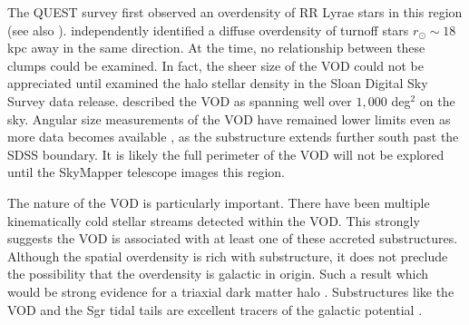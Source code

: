 \documentclass{emulateapj}
\begin{document}
The QUEST survey \citet{Vivas;et-al_2001} first observed an overdensity of RR Lyrae stars in this region (see also \citet{Zinn;etal_2004}). \citet{Newberg;et-al_2002} independently identified a diffuse overdensity of turnoff stars $r_\odot \sim18$ kpc away in the same direction. At the time, no relationship between these clumps could be examined. In fact, the sheer size of the VOD could not be appreciated until \citet{Juric;et-al_2008} examined the halo stellar density in the Sloan Digital Sky Survey \citep[hereafter SDSS]{York;et-al_2000} data release. \citet{Juric;et-al_2008} described the VOD as spanning well over $1,000$ deg$^{2}$ on the sky. Angular size measurements of the VOD have remained lower limits even as more data becomes available \citep{Duffau;et-al_2006, Juric;et-al_2008, Bonaco;et-al_2012}, as the substructure extends further south past the SDSS boundary. It is likely the full perimeter of the VOD will not be explored until the SkyMapper telescope \citep{Keller;et-al_2007} images this region.

The nature of the VOD is particularly important. There have been multiple kinematically cold stellar streams detected within the VOD. This strongly suggests the VOD is associated with at least one of these accreted substructures. Although the spatial overdensity is rich with substructure, it does not preclude the possibility that the overdensity is galactic in origin. Such a result which would be strong evidence for a triaxial dark matter halo \citep{Newberg;et-al_2007}. Substructures like the VOD and the Sgr tidal tails are excellent tracers of the galactic potential \citep{Law;et-al_2005, Casey;et-al_2012a}.






\end{document}
